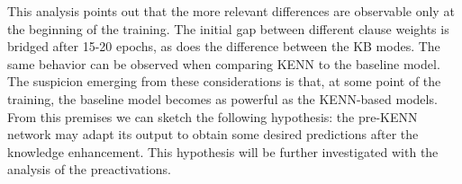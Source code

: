 This analysis points out that the more relevant differences are observable only at the beginning of the training. The initial gap between different clause weights is bridged after 15-20 epochs, as does the difference between the KB modes. The same behavior can be observed when comparing KENN to the baseline model. The suspicion emerging from these considerations is that, at some point of the training, the baseline model becomes as powerful as the KENN-based models. 
From this premises we can sketch the following hypothesis: the pre-KENN network may adapt its output to obtain some desired predictions after the knowledge enhancement. This hypothesis will be further investigated with the analysis of the preactivations.